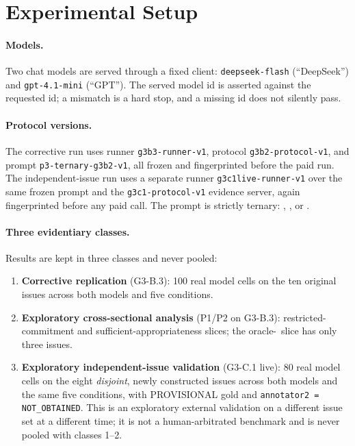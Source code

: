 \section{Experimental Setup}
\label{sec:setup}

\paragraph{Models.}
Two chat models are served through a fixed client: \texttt{deepseek-flash}
(``DeepSeek'') and \texttt{gpt-4.1-mini} (``GPT''). The served model id is
asserted against the requested id; a mismatch is a hard stop, and a missing id
does not silently pass.

\paragraph{Protocol versions.}
The corrective run uses runner \texttt{g3b3-runner-v1}, protocol
\texttt{g3b2-protocol-v1}, and prompt \texttt{p3-ternary-g3b2-v1}, all frozen
and fingerprinted before the paid run. The independent-issue run uses a
separate runner \texttt{g3c1live-runner-v1} over the same frozen prompt and
the \texttt{g3c1-protocol-v1} evidence server, again fingerprinted before any
paid call. The prompt is strictly ternary:
\ACCEPT, \REJECT, or \NEED.

\paragraph{Three evidentiary classes.}
Results are kept in three classes and never pooled:
\begin{enumerate}[leftmargin=1.6em,itemsep=1pt,topsep=2pt]
  \item \textbf{Corrective replication} (G3-B.3): 100 real model cells on the
  ten original issues across both models and five conditions.
  \item \textbf{Exploratory cross-sectional analysis} (P1/P2 on G3-B.3):
  restricted-commitment and sufficient-appropriateness slices; the
  oracle-\REJECT\ slice has only three issues.
  \item \textbf{Exploratory independent-issue validation} (G3-C.1 live):
  80 real model cells on the eight \emph{disjoint}, newly constructed issues
  across both models and the same five conditions, with PROVISIONAL gold and
  \texttt{annotator2 = NOT\_OBTAINED}. This is an exploratory external
  validation on a different issue set at a different time; it is not a
  human-arbitrated benchmark and is never pooled with classes 1--2.
\end{enumerate}

